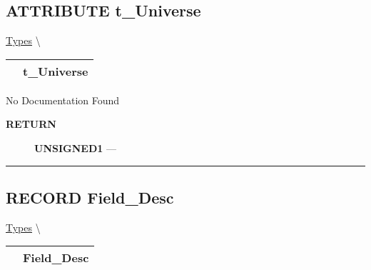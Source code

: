 \subsection*{\textsf{\colorbox{headtoc}{\color{white} ATTRIBUTE}
t\_Universe}}

\hypertarget{ecldoc:logisticregression.types.t_universe}{}
\hspace{0pt} \hyperlink{ecldoc:LogisticRegression.Types}{Types} \textbackslash 

{\renewcommand{\arraystretch}{1.5}
\begin{tabularx}{\textwidth}{|>{\raggedright\arraybackslash}l|X|}
\hline
\hspace{0pt}\mytexttt{\color{red} } & \textbf{t\_Universe} \\
\hline
\end{tabularx}
}

\par





No Documentation Found








\par
\begin{description}
\item [\colorbox{tagtype}{\color{white} \textbf{\textsf{RETURN}}}] \textbf{UNSIGNED1} --- 
\end{description}




\rule{\linewidth}{0.5pt}
\subsection*{\textsf{\colorbox{headtoc}{\color{white} RECORD}
Field\_Desc}}

\hypertarget{ecldoc:logisticregression.types.field_desc}{}
\hspace{0pt} \hyperlink{ecldoc:LogisticRegression.Types}{Types} \textbackslash 

{\renewcommand{\arraystretch}{1.5}
\begin{tabularx}{\textwidth}{|>{\raggedright\arraybackslash}l|X|}
\hline
\hspace{0pt}\mytexttt{\color{red} } & \textbf{Field\_Desc} \\
\hline
\end{tabularx}
}

\par






